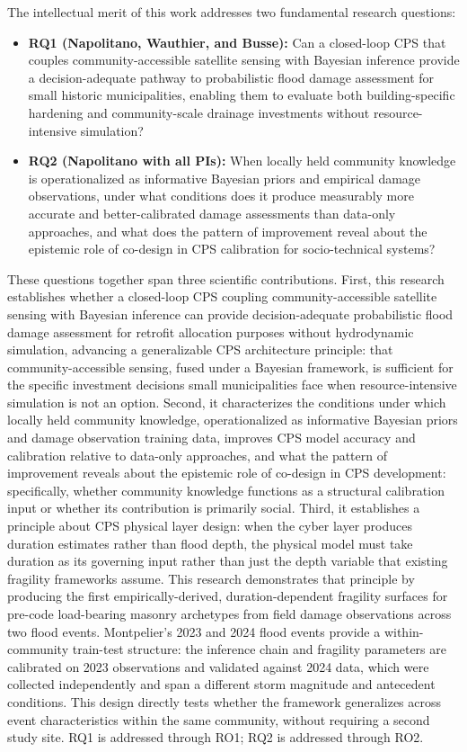 \documentclass[11pt]{article}
\begin{document}
The intellectual merit of this work addresses two fundamental research questions:

\begin{itemize}[leftmargin=1.5em,itemsep=0pt]
\item \textbf{RQ1 (Napolitano, Wauthier, and Busse):} Can a closed-loop CPS that couples community-accessible satellite sensing with Bayesian inference provide a decision-adequate pathway to probabilistic flood damage assessment for small historic municipalities, enabling them to evaluate both building-specific hardening and community-scale drainage investments without resource-intensive simulation?
\item \textbf{RQ2 (Napolitano with all PIs):} When locally held community knowledge
is operationalized as informative Bayesian priors and empirical damage observations,
under what conditions does it produce measurably more accurate and better-calibrated
damage assessments than data-only approaches, and what does the pattern of improvement
reveal about the epistemic role of co-design in CPS calibration for socio-technical
systems?
\end{itemize}

These questions together span three scientific contributions.
First, this research establishes whether a closed-loop CPS coupling community-accessible satellite sensing with Bayesian inference can provide decision-adequate probabilistic flood damage assessment for retrofit allocation purposes without hydrodynamic simulation, advancing a generalizable CPS architecture principle: that community-accessible sensing, fused under a Bayesian framework, is sufficient for the specific investment decisions small municipalities face when resource-intensive simulation is not an option.
Second, it characterizes the conditions under which locally held community knowledge, operationalized as informative Bayesian priors and damage observation training data, improves CPS model accuracy and calibration relative to data-only approaches, and what the pattern of improvement reveals about the epistemic role of co-design in CPS development: specifically, whether community knowledge functions as a structural calibration input or whether its contribution is primarily social.
Third, it establishes a principle about CPS physical layer design: when the cyber layer produces duration estimates rather than flood depth, the physical model must take duration as its governing input rather than just the depth variable that existing fragility frameworks assume. This research demonstrates that principle by producing the first empirically-derived, duration-dependent fragility surfaces for pre-code load-bearing masonry archetypes from field damage observations across two flood events.
Montpelier's 2023 and 2024 flood events provide a within-community train-test structure: the inference chain and fragility parameters are calibrated on 2023 observations and validated against 2024 data, which were collected independently and span a different storm magnitude and antecedent conditions. This design directly tests whether the framework generalizes across event characteristics within the same community, without requiring a second study site.
RQ1 is addressed through RO1; RQ2 is addressed through RO2.
\end{document}
